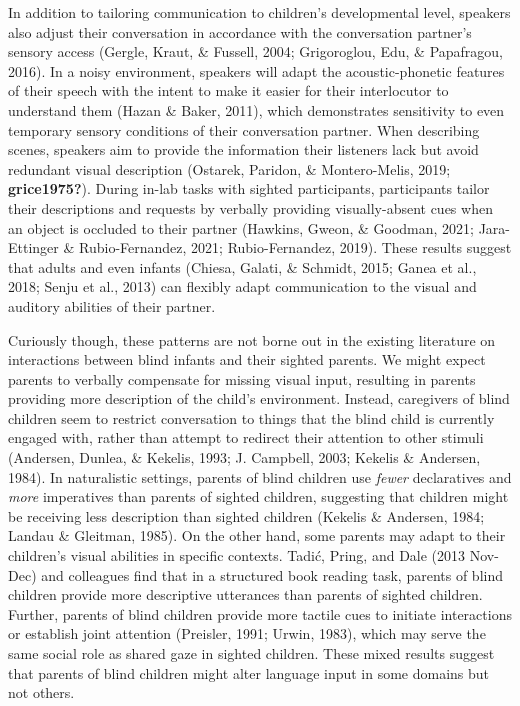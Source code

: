 \documentclass[
  man,floatsintext]{apa6}
\begin{document}
In addition to tailoring communication to children's developmental level, speakers also adjust their conversation in accordance with the conversation partner's sensory access (Gergle, Kraut, \& Fussell, 2004; Grigoroglou, Edu, \& Papafragou, 2016). In a noisy environment, speakers will adapt the acoustic-phonetic features of their speech with the intent to make it easier for their interlocutor to understand them (Hazan \& Baker, 2011), which demonstrates sensitivity to even temporary sensory conditions of their conversation partner. When describing scenes, speakers aim to provide the information their listeners lack but avoid redundant visual description (Ostarek, Paridon, \& Montero-Melis, 2019; \textbf{grice1975?}). During in-lab tasks with sighted participants, participants tailor their descriptions and requests by verbally providing visually-absent cues when an object is occluded to their partner (Hawkins, Gweon, \& Goodman, 2021; Jara-Ettinger \& Rubio-Fernandez, 2021; Rubio-Fernandez, 2019). These results suggest that adults and even infants (Chiesa, Galati, \& Schmidt, 2015; Ganea et al., 2018; Senju et al., 2013) can flexibly adapt communication to the visual and auditory abilities of their partner.

Curiously though, these patterns are not borne out in the existing literature on interactions between blind infants and their sighted parents. We might expect parents to verbally compensate for missing visual input, resulting in parents providing more description of the child's environment. Instead, caregivers of blind children seem to restrict conversation to things that the blind child is currently engaged with, rather than attempt to redirect their attention to other stimuli (Andersen, Dunlea, \& Kekelis, 1993; J. Campbell, 2003; Kekelis \& Andersen, 1984). In naturalistic settings, parents of blind children use \emph{fewer} declaratives and \emph{more} imperatives than parents of sighted children, suggesting that children might be receiving less description than sighted children (Kekelis \& Andersen, 1984; Landau \& Gleitman, 1985). On the other hand, some parents may adapt to their children's visual abilities in specific contexts. Tadić, Pring, and Dale (2013 Nov-Dec) and colleagues find that in a structured book reading task, parents of blind children provide more descriptive utterances than parents of sighted children. Further, parents of blind children provide more tactile cues to initiate interactions or establish joint attention (Preisler, 1991; Urwin, 1983), which may serve the same social role as shared gaze in sighted children. These mixed results suggest that parents of blind children might alter language input in some domains but not others.
\end{document}
